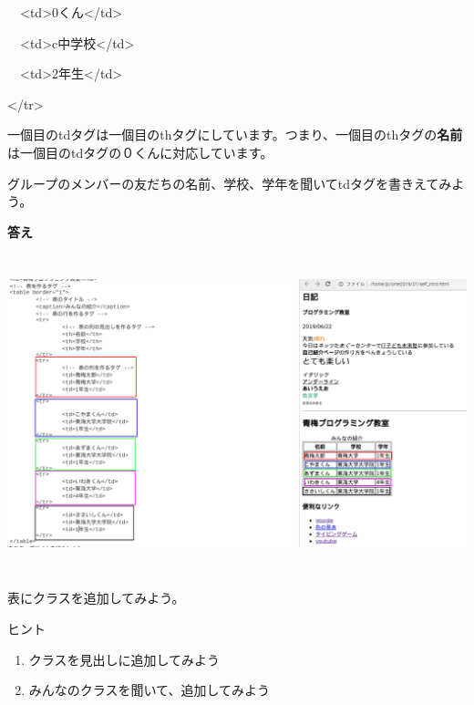 \documentclass[a4paper,12pt]{jarticle}
\begin{document}
\ \ {\textless}td{\textgreater}0くん{\textless}/td{\textgreater}

\ \ {\textless}td{\textgreater}c中学校{\textless}/td{\textgreater}

\ \ {\textless}td{\textgreater}2年生{\textless}/td{\textgreater}

{\textless}/tr{\textgreater}

一個目のtdタグは一個目のthタグにしています。つまり、一個目のthタグの\textbf{名前}は一個目のtdタグの０くんに対応しています。


\bigskip


\bigskip

グループのメンバーの友だちの名前、学校、学年を聞いてtdタグを書きえてみよう。


\bigskip


\bigskip



\bigskip

\clearpage
\textbf{答え}




\bigskip


\bigskip


\bigskip
\includegraphics[width=15.861cm,height=9.245cm]{textbook-img192.png}




\bigskip

\bigskip

\bigskip

\theQuestion

表にクラスを追加してみよう。

ヒント

\begin{enumerate}
  \item クラスを見出しに追加してみよう
  \item
        みんなのクラスを聞いて、追加してみよう
\end{enumerate}
\theQuestion
\end{document}

